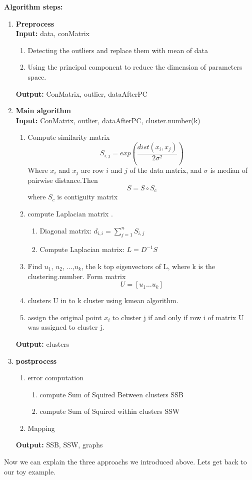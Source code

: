 \documentclass{article}
\begin{document}
{\bf Algorithm steps:}
\begin{enumerate}
\item {\bf Preprocess}\\
{\bf Input:} data, conMatrix
\begin{enumerate}
\item Detecting the outliers and replace them with mean of data
\item Using the principal component to reduce the dimension of parameters space.
\end{enumerate}
{\bf Output:} ConMatrix, outlier, dataAfterPC
\item {\bf Main algorithm}\\
{\bf Input:} ConMatrix, outlier, dataAfterPC, cluster.number(k)
\begin{enumerate}
\item Compute similarity matrix
$$ S_{i,j}= exp(\frac{dist(x_i,x_j)}{2\sigma ^2})  $$
Where $x_i$ and $x_j$ are row $i$ and $j$ of the data matrix, and  $\sigma$ is median of pairwise distance.Then 
$$S=S\circ S_c$$
where $S_c$ is contiguity matrix
\item compute Laplacian matrix . 
  \begin{enumerate}
     
    \item Diagonal matrix: $ d_{i,i}= \sum_{j=1}^{n} S_{i,j}$
    \item Compute Laplacian matrix: $L= D^{-1}S$
  \end{enumerate}
\item Find $u_1$, $u_2$, $\ldots$,$u_k$, the k top eigenvectors of L, where k is the clustering.number. Form matrix $$ U = [u_1 \ldots u_k]$$
\item clusters U in to k cluster using kmean algorithm.
\item assign the original point  $x_i$ to cluster j if and only if  row i of matrix U was assigned to cluster j.
\end{enumerate}
{\bf Output:} clusters
\item{\bf postprocess}
\begin{enumerate}
{\bf Input:} clusters, latLon, data
\item{error computation}
\begin{enumerate}
\item compute Sum of Squired Between clusters SSB
\item compute Sum of Squired within clusters SSW
\end{enumerate}
\item{Mapping}
\end{enumerate}
{\bf Output:} SSB, SSW, graphs
\end{enumerate}
Now we can explain the three approachs we introduced above. Lets get back to our toy example. 
\end{document}
